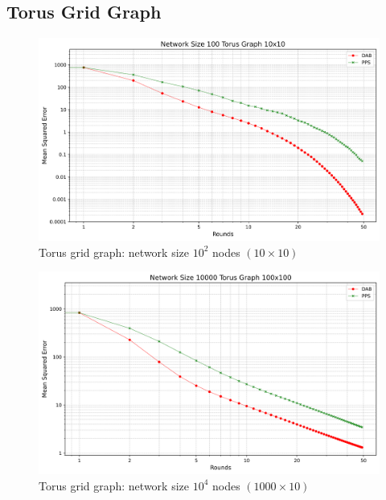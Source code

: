 \subsection{Torus Grid Graph}
\begin{figure}[H]
    \centering
    \includegraphics[scale=0.5]{figures/torusGridGraphSimulations/DAB_vs_PPS_TG_r50_n100.png}
    \caption{Torus grid graph: network size $10^{2}$ nodes $(10 \times 10)$}
    \label{fig:100Torusgraph}
\end{figure}
\begin{figure}[H]
    \centering
    \includegraphics[scale=0.5]{figures/torusGridGraphSimulations/100x100/DAB_vs_PPS_TG_r50_n10000.png}
    \caption{Torus grid graph: network size $10^{4}$ nodes $(1000 \times 10)$}
    \label{fig:100x100Torusgraph}
\end{figure}
